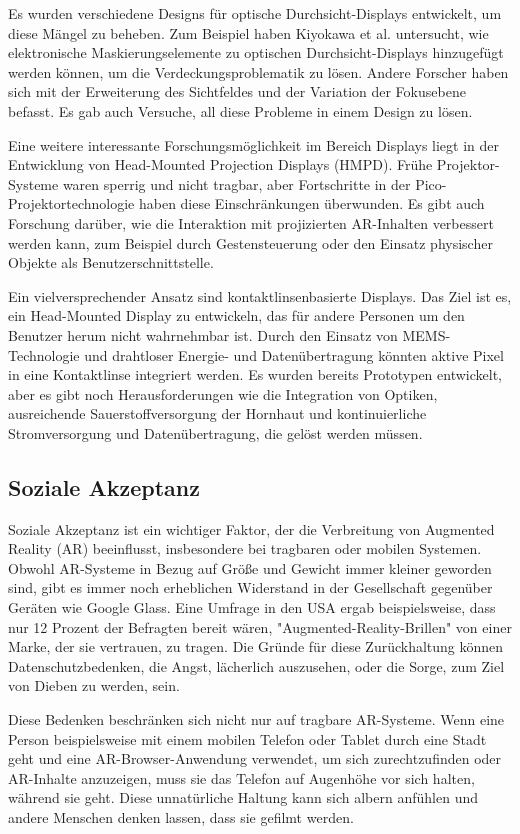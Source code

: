 Es wurden verschiedene Designs für optische Durchsicht-Displays entwickelt, um
diese Mängel zu beheben. Zum Beispiel haben Kiyokawa et al. untersucht, wie
elektronische Maskierungselemente zu optischen Durchsicht-Displays hinzugefügt
werden können, um die Verdeckungsproblematik zu lösen. Andere Forscher haben
sich mit der Erweiterung des Sichtfeldes und der Variation der Fokusebene
befasst. Es gab auch Versuche, all diese Probleme in einem Design zu lösen.

Eine weitere interessante Forschungsmöglichkeit im Bereich Displays liegt in
der Entwicklung von Head-Mounted Projection Displays (HMPD). Frühe
Projektor-Systeme waren sperrig und nicht tragbar, aber Fortschritte in der
Pico-Projektortechnologie haben diese Einschränkungen überwunden. Es gibt auch
Forschung darüber, wie die Interaktion mit projizierten AR-Inhalten verbessert
werden kann, zum Beispiel durch Gestensteuerung oder den Einsatz physischer
Objekte als Benutzerschnittstelle.

Ein vielversprechender Ansatz sind kontaktlinsenbasierte Displays. Das Ziel ist
es, ein Head-Mounted Display zu entwickeln, das für andere Personen um den
Benutzer herum nicht wahrnehmbar ist. Durch den Einsatz von MEMS-Technologie
und drahtloser Energie- und Datenübertragung könnten aktive Pixel in eine
Kontaktlinse integriert werden. Es wurden bereits Prototypen entwickelt, aber
es gibt noch Herausforderungen wie die Integration von Optiken, ausreichende
Sauerstoffversorgung der Hornhaut und kontinuierliche Stromversorgung und
Datenübertragung, die gelöst werden müssen.
\subsection{Soziale Akzeptanz}

Soziale Akzeptanz ist ein wichtiger Faktor, der die Verbreitung von Augmented
Reality (AR) beeinflusst, insbesondere bei tragbaren oder mobilen Systemen.
Obwohl AR-Systeme in Bezug auf Größe und Gewicht immer kleiner geworden sind,
gibt es immer noch erheblichen Widerstand in der Gesellschaft gegenüber Geräten
wie Google Glass. Eine Umfrage in den USA ergab beispielsweise, dass nur 12
Prozent der Befragten bereit wären, "Augmented-Reality-Brillen" von einer
Marke, der sie vertrauen, zu tragen. Die Gründe für diese Zurückhaltung können
Datenschutzbedenken, die Angst, lächerlich auszusehen, oder die Sorge, zum Ziel
von Dieben zu werden, sein.

Diese Bedenken beschränken sich nicht nur auf tragbare AR-Systeme. Wenn eine
Person beispielsweise mit einem mobilen Telefon oder Tablet durch eine Stadt
geht und eine AR-Browser-Anwendung verwendet, um sich zurechtzufinden oder
AR-Inhalte anzuzeigen, muss sie das Telefon auf Augenhöhe vor sich halten,
während sie geht. Diese unnatürliche Haltung kann sich albern anfühlen und
andere Menschen denken lassen, dass sie gefilmt werden.

